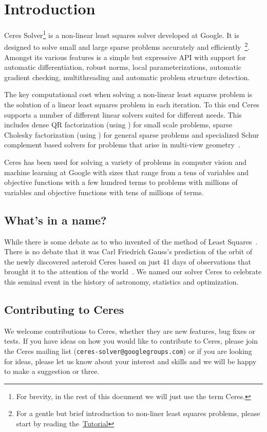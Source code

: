 \chapter{Introduction}
\label{sec:introduction}
Ceres Solver\footnote{For brevity, in the rest of this document we will just use the term Ceres.} is a non-linear least squares solver developed at Google. It is designed to solve small and large sparse problems accurately and efficiently~\footnote{For a gentle but brief introduction to non-liner least squares problems, please start by reading the~\hyperref[chapter:tutorial]{Tutorial}}. Amongst its various features is a simple but expressive API with support for automatic differentiation, robust norms, local parameterizations, automatic gradient checking, multithreading and automatic problem structure detection.

The key computational cost when solving a non-linear least squares problem is the solution of a linear least squares problem in each iteration. To this end Ceres supports a number of different linear solvers suited for different needs. This includes dense QR factorization (using \eigen) for small scale problems, sparse Cholesky factorization (using \cholmod) for general sparse problems and specialized Schur complement based solvers for problems that arise in multi-view geometry~\cite{hartley-zisserman-book-2004}.

Ceres has been used for solving a variety of problems in computer vision and machine learning at Google with sizes that range from a tens of variables and objective functions with a few hundred terms to problems with millions of variables and objective functions with tens of millions of terms. 

\section{What's in a name?}
While there is some debate as to who invented of the method of Least Squares~\cite{stigler1981gauss}. There is no debate that it was Carl Friedrich Gauss's prediction of the orbit of the newly discovered asteroid Ceres based on just 41 days of observations that brought it to the attention of the world~\cite{tennenbaum-director}. We named our solver Ceres to celebrate this seminal event in the history of astronomy, statistics and optimization.

\section{Contributing to Ceres}
We welcome contributions to Ceres, whether they are new features, bug fixes or tests. If you have ideas on how you would like to contribute to Ceres, please join the Ceres mailing list (\texttt{ceres-solver@googlegroups.com}) or if you are looking for ideas, please let us know about your interest and skills and we will be happy to make a suggestion or three.

